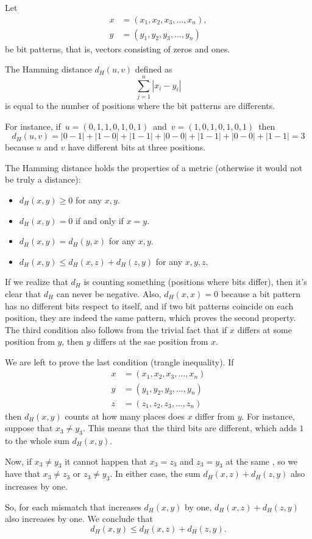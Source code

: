 \documentclass[12pt]{article}
\begin{document}
Let 
\begin{align*}
x &= (x_1,x_2,x_3,\ldots,x_n),\\
y &= (y_1,y_2,y_3,\ldots,y_n)
\end{align*}
be bit patterns, that is, vectors consisting of zeros and ones.

The Hamming distance $d_H(u,v)$ defined as 
\[
\sum_{j=1}^n |x_i-y_i|
\]
is equal to the number of positions where the bit patterns are differents.


For instance, if 
\,$u =(0,1,1,0,1,0,1)$\, and \,$v =(1,0,1,0,1,0,1)$\,
 then
\[
d_H(u,v) = |0-1|+ |1-0| + |1-1| + |0-0|+|1-1| + |0-0| + |1-1| = 3
\]
because $u$ and $v$ have different bits at three positions.

The Hamming distance holds the properties of a metric (otherwise it would not be truly a distance):
\begin{itemize}
\item $d_H(x,y)\geq 0$ for any $x,y$.\\
\item $d_H(x,y)=0$ if and only if $x=y$.\\
\item $d_H(x,y) = d_H(y,x)$ for any $x,y$.\\
\item $d_H(x,y)\leq d_H(x,z) +  d_H(z,y)$ for any $x,y,z$.
\end{itemize}

If we realize that $d_H$ is counting something (positions where bits differ), then it's clear that $d_H$ can never be negative. Also, $d_H(x,x)= 0$ because a bit pattern has no different bits respect to itself, and if two bit patterns coincide on each position, they are indeed the same pattern, which proves the second property. The third condition also follows from the trivial fact that if $x$ differs at some position from $y$, then $y$ differs at the sae position from $x$.

We are left to prove the last condition (trangle inequality).
If 
\begin{align*}
x &= (x_1,x_2,x_3,\ldots,x_n)\\
y &= (y_1,y_2,y_3,\ldots,y_n)\\
z &= (z_1,z_2,z_3,\ldots,z_n)
\end{align*}
then $d_H(x,y)$ counts at how many places does $x$ differ from $y$. For instance, suppose that $x_3\neq y_3$. This means that the third bits are different, which adds $1$ to the whole sum $d_H(x,y)$.

Now, if $x_3\neq y_3$ it cannot happen that $x_3=z_3$ and $z_3=y_3$ at the same , so we have that $x_3\neq z_3$ or $z_3\neq y_3$. In either case, the sum $d_H(x,z) + d_H(z,y)$ also increases by one.

So, for each mismatch that increases $d_H(x,y)$ by one, $d_H(x,z)+ d_H(z,y)$ also increases by one. We conclude that
\[
d_H(x,y)\leq d_H(x,z) + d_H(z,y).
\]
\end{document}
